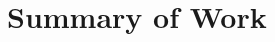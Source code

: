\documentclass[12pt]{article}
\begin{document}
\maketitle


\section*{\centering Summary of Work}

\lipsum[1-3] %




\end{document}
